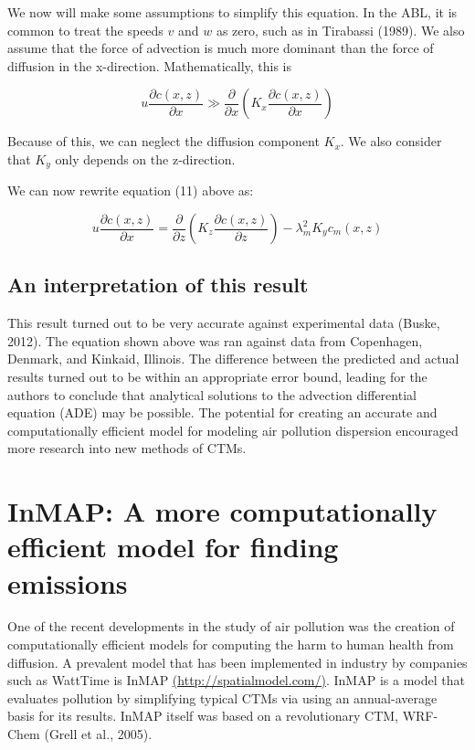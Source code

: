 \documentclass{article}
\begin{document}
We now will make some assumptions to simplify this equation. In the ABL, it is common to treat the speeds $v$ and $w$ as zero, such as in Tirabassi (1989).
We also assume that the force of advection is much more dominant than the force of diffusion in the x-direction. Mathematically, this is

$$
    u \frac{\partial c(x, z)}{\partial x} \gg \frac{\partial}{\partial x} (K_x\frac{\partial c(x, z)}{\partial x})
$$

Because of this, we can neglect the diffusion component $K_x$. We also consider that $K_y$ only depends on the z-direction.

We can now rewrite equation (11) above as:

\begin{equation}
    u \frac{\partial c(x, z)}{\partial x} = \frac{\partial} {\partial z} (K_z \frac{\partial c(x, z)}{\partial z}) - \lambda_m^2 K_y c_m(x, z)
\end{equation}

\subsection{An interpretation of this result}

This result turned out to be very accurate against experimental data (Buske, 2012). 
The equation shown above was ran against data from Copenhagen, Denmark, and Kinkaid, Illinois. 
The difference between the predicted and actual results turned out to be within an appropriate 
error bound, leading for the authors to conclude that analytical solutions to the advection differential
equation (ADE) may be possible. The potential for creating an accurate and computationally efficient model
for modeling air pollution dispersion encouraged more research into new methods of CTMs.

\section{InMAP: A more computationally efficient model for finding emissions}

One of the recent developments in the study of air pollution was the creation of computationally efficient models for computing the harm to human health from
diffusion. A prevalent model that has been implemented in industry by companies such as WattTime is InMAP \url{(http://spatialmodel.com/)}. 
InMAP is a model that evaluates pollution by simplifying typical CTMs via using an annual-average basis for its results. InMAP itself
was based on a revolutionary CTM, WRF-Chem (Grell et al., 2005). 
\end{document}
